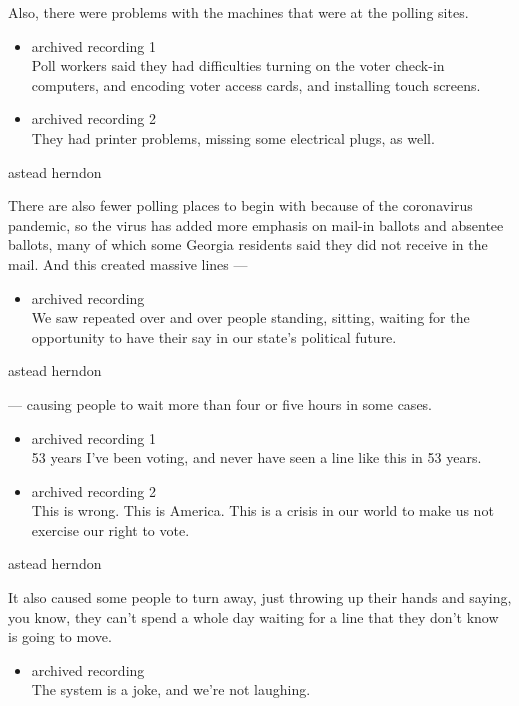 Also, there were problems with the machines that were at the polling
sites.

\begin{itemize}
\item
  archived recording 1\\
  Poll workers said they had difficulties turning on the voter check-in
  computers, and encoding voter access cards, and installing touch
  screens.
\item
  archived recording 2\\
  They had printer problems, missing some electrical plugs, as well.
\end{itemize}

astead herndon

There are also fewer polling places to begin with because of the
coronavirus pandemic, so the virus has added more emphasis on mail-in
ballots and absentee ballots, many of which some Georgia residents said
they did not receive in the mail. And this created massive lines ---

\begin{itemize}
\tightlist
\item
  archived recording\\
  We saw repeated over and over people standing, sitting, waiting for
  the opportunity to have their say in our state's political future.
\end{itemize}

astead herndon

--- causing people to wait more than four or five hours in some cases.

\begin{itemize}
\item
  archived recording 1\\
  53 years I've been voting, and never have seen a line like this in 53
  years.
\item
  archived recording 2\\
  This is wrong. This is America. This is a crisis in our world to make
  us not exercise our right to vote.
\end{itemize}

astead herndon

It also caused some people to turn away, just throwing up their hands
and saying, you know, they can't spend a whole day waiting for a line
that they don't know is going to move.

\begin{itemize}
\tightlist
\item
  archived recording\\
  The system is a joke, and we're not laughing.
\end{itemize}

